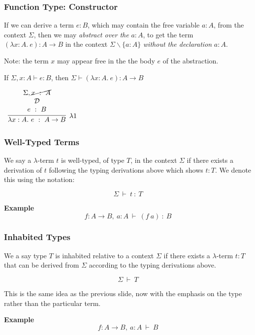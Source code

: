 \documentclass{beamer}
\theoremstyle{indentDefn} \newtheorem{defn}[]{Definition}
\begin{document}
\begin{frame}
  \frametitle{Function Type: Constructor}

  If we can derive a term $e : B$, which may contain the free variable $a:A$, from the context $\Sigma$, then we may \emph{abstract over the} $a : A$, to get the term $(\lambda x : A. \ e) : A \to B$ in the context $\Sigma \backslash \{a:A\}$ \emph{without the declaration} $a : A$. 
  
  Note: the term $x$ may appear free in the the body $e$ of the abstraction. 

  If $\Sigma, x : A \vdash e : B$, then $\Sigma \vdash (\lambda x : A. \ e) : A \to B$

  \vspace{5mm}

	\begin{center}		
		$\begin{array}{c}		
			\infer[\lambda 1]{\lambda x:A. \ e \ : \ A \to B}
				{\begin{array}{c} \Sigma, \cancel{x \ : \ A} \\ \mathcal{D} \\ e \ : \ B \end{array}}
		\end{array}$
	\end{center}
  
  \vspace{20mm}

\end{frame}

\begin{frame}
  \frametitle{Well-Typed Terms}

  We say a $\lambda$-term $t$ is well-typed, of type $T$, in the context $\Sigma$ if there exists a derivation of $t$ following the typing derivations above which shows $t : T$. We denote this using the notation:

  $$\Sigma \ \vdash \ t \ : \ T$$

  {\bf Example} $$f : A \to B, \ a : A \ \vdash \ (f \ a) \ : \ B$$

  \vspace{3cm}

\end{frame}

\begin{frame}
  \frametitle{Inhabited Types}

  We a say type $T$ is inhabited relative to a context $\Sigma$ if there exists a $\lambda$-term $t : T$ that can be derived from $\Sigma$ according to the typing derivations above. 

  $$\Sigma \ \vdash \ T$$
  
  This is the same idea as the previous slide, now with the emphasis on the type rather than the particular term.

  {\bf Example} $$f : A \to B, \ a : A \ \vdash \ B$$

  \vspace{30mm}

\end{frame}
\end{document}
